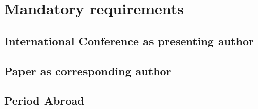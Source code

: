 \section{Mandatory requirements}

\subsection{International Conference as presenting author}

\subsection{Paper as corresponding author}

\subsection{Period Abroad}